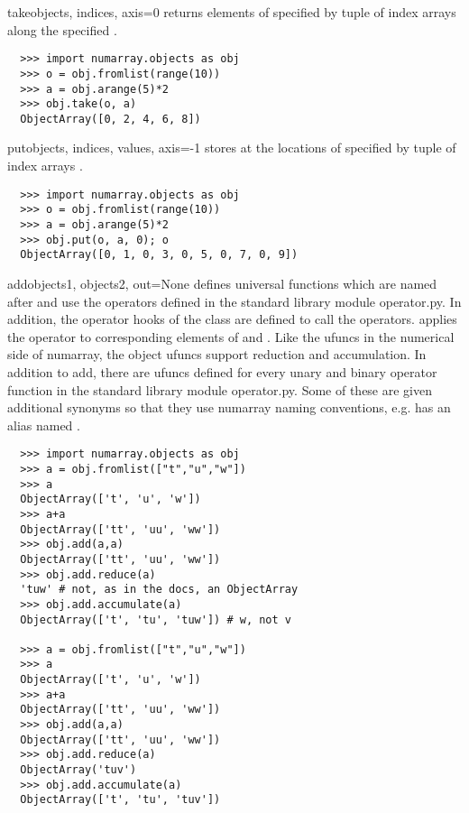 \begin{funcdesc}{take}{objects, indices, axis=0}
  \label{func:obj.take}
   returns elements of  specified by tuple of index
  arrays  along the specified .
\begin{verbatim}
  >>> import numarray.objects as obj
  >>> o = obj.fromlist(range(10))
  >>> a = obj.arange(5)*2
  >>> obj.take(o, a)
  ObjectArray([0, 2, 4, 6, 8])
\end{verbatim}
\end{funcdesc}

\begin{funcdesc}{put}{objects, indices, values, axis=-1}
  \label{func:obj.put}
   stores  at the locations of 
  specified by tuple of index arrays .
\begin{verbatim}
  >>> import numarray.objects as obj
  >>> o = obj.fromlist(range(10))
  >>> a = obj.arange(5)*2
  >>> obj.put(o, a, 0); o
  ObjectArray([0, 1, 0, 3, 0, 5, 0, 7, 0, 9])
\end{verbatim}
\end{funcdesc}

\begin{funcdesc}{add}{objects1, objects2, out=None}
  \label{func:obj.add}
   defines universal functions which are named after and
  use the operators defined in the standard library module operator.py.  In
  addition, the operator hooks of the  class are defined to
  call the operators.   applies the  operator to
  corresponding elements of  and .  Like the ufuncs
  in the numerical side of numarray, the object ufuncs support reduction and
  accumulation.  In addition to add, there are ufuncs defined for every unary
  and binary operator function in the standard library module operator.py.
  Some of these are given additional synonyms so that they use numarray naming
  conventions, e.g.  has an alias named .
\begin{verbatim}
  >>> import numarray.objects as obj
  >>> a = obj.fromlist(["t","u","w"])
  >>> a
  ObjectArray(['t', 'u', 'w'])
  >>> a+a
  ObjectArray(['tt', 'uu', 'ww'])
  >>> obj.add(a,a)
  ObjectArray(['tt', 'uu', 'ww'])
  >>> obj.add.reduce(a)
  'tuw' # not, as in the docs, an ObjectArray
  >>> obj.add.accumulate(a)
  ObjectArray(['t', 'tu', 'tuw']) # w, not v

  >>> a = obj.fromlist(["t","u","w"])
  >>> a
  ObjectArray(['t', 'u', 'w'])
  >>> a+a
  ObjectArray(['tt', 'uu', 'ww'])
  >>> obj.add(a,a)
  ObjectArray(['tt', 'uu', 'ww'])
  >>> obj.add.reduce(a)
  ObjectArray('tuv')
  >>> obj.add.accumulate(a)
  ObjectArray(['t', 'tu', 'tuv'])
\end{verbatim}
\end{funcdesc}

